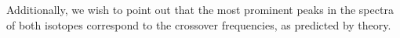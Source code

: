 \documentclass[12pt]{article}
\begin{document}
Additionally, we wish to point out that the most prominent peaks in the spectra of both isotopes correspond to the crossover frequencies, as predicted by theory.


\begin{figure}[ht!]
	\begin{center}
		\\ %
\end{center}
\end{figure}
\end{document}
